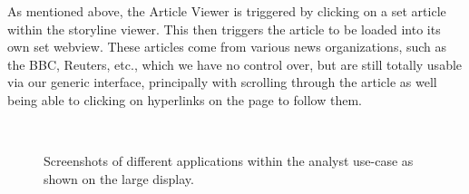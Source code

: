 As mentioned above, the Article Viewer is triggered by clicking on a
set article within the storyline viewer. This then triggers the
article to be loaded into its own set webview. These articles
come from various news organizations, such as the BBC, Reuters, etc.,
which we have no control over, but are still totally usable via our
generic interface, principally with scrolling through the article as well
being able to clicking on hyperlinks on the page to follow them.

\begin{figure}
\centering
    \hfill
    \hfill
    \hfill
    \\
    \hfill
    \hfill
    \hfill
  \caption{Screenshots of different applications within the analyst use-case as shown on the large display.}
  \label{fig:application_specific_ui}
\end{figure}

